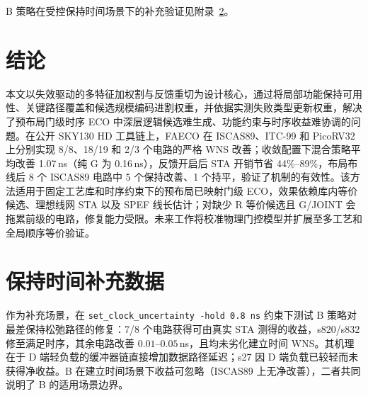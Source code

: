 \documentclass[twocolumn,10pt,fontset=windows]{ctexart}
\begin{document}
B 策略在受控保持时间场景下的补充验证见\mbox{附录~\ref{app:hold}}。
\FloatBarrier
\newpage
\section{结论}\label{sec:conclusion}

本文以失效驱动的多特征加权割与反馈重切为设计核心，通过将局部功能保持可用性、关键路径覆盖和候选规模编码进割权重，并依据实测失败类型更新权重，解决了预布局门级时序 ECO 中深层逻辑候选难生成、功能约束与时序收益难协调的问题。在公开 SKY130 HD 工具链上，FAECO 在 ISCAS89、ITC-99 和 PicoRV32 上分别实现 8/8、18/19 和 2/3 个电路的严格 WNS 改善；收敛配置下混合策略平均改善 1.07\,ns（纯 G 为 0.16\,ns），反馈开启后 STA 开销节省 44\%--89\%，布局布线后 8 个 ISCAS89 电路中 5 个保持改善、1 个持平，验证了机制的有效性。该方法适用于固定工艺库和时序约束下的预布局已映射门级 ECO，效果依赖库内等价候选、理想线网 STA 以及 SPEF 线长估计；对缺少 R 等价候选且 G/JOINT 会拖累前级的电路，修复能力受限。未来工作将校准物理门控模型并扩展至多工艺和全局顺序等价验证。




\clearpage
\onecolumn
\appendix
\section{保持时间补充数据}\label{app:hold}

作为补充场景，在 \texttt{set\_clock\_uncertainty -hold 0.8\,ns} 约束下测试 B 策略对最差保持松弛路径的修复：7/8 个电路获得可由真实 STA 测得的收益，s820/s832 修至满足时序，其余电路改善 $0.01$--$0.05\,$ns，且均未劣化建立时间 WNS。其机理在于 D 端轻负载的缓冲器链直接增加数据路径延迟；s27 因 D 端负载已较轻而未获得净收益。B 在建立时间场景下收益可忽略（ISCAS89 上无净改善），二者共同说明了 B 的适用场景边界。
\end{document}
